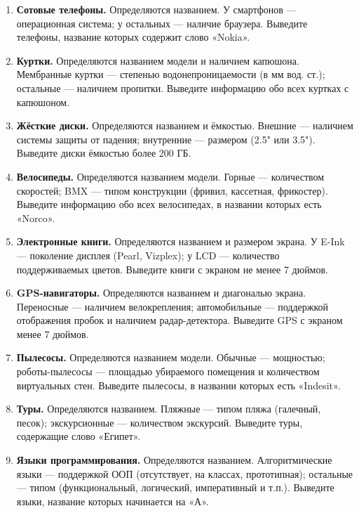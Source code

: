 \begin{enumerate}
    \item \textbf{Сотовые телефоны.}  
    Определяются названием. У смартфонов — операционная система; у остальных — наличие браузера.  
    Выведите телефоны, название которых содержит слово «Nokia».

    \item \textbf{Куртки.}  
    Определяются названием модели и наличием капюшона. Мембранные куртки — степенью водонепроницаемости (в мм вод. ст.); остальные — наличием пропитки.  
    Выведите информацию обо всех куртках с капюшоном.

    \item \textbf{Жёсткие диски.}  
    Определяются названием и ёмкостью. Внешние — наличием системы защиты от падения; внутренние — размером (2.5" или 3.5").  
    Выведите диски ёмкостью более 200 ГБ.

    \item \textbf{Велосипеды.}  
    Определяются названием модели. Горные — количеством скоростей; BMX — типом конструкции (фривил, кассетная, фрикостер).  
    Выведите информацию обо всех велосипедах, в названии которых есть «Norco».

    \item \textbf{Электронные книги.}  
    Определяются названием и размером экрана. У E-Ink — поколение дисплея (Pearl, Vizplex); у LCD — количество поддерживаемых цветов.  
    Выведите книги с экраном не менее 7 дюймов.

    \item \textbf{GPS-навигаторы.}  
    Определяются названием и диагональю экрана. Переносные — наличием велокрепления; автомобильные — поддержкой отображения пробок и наличием радар-детектора.  
    Выведите GPS с экраном менее 7 дюймов.

    \item \textbf{Пылесосы.}  
    Определяются названием модели. Обычные — мощностью; роботы-пылесосы — площадью убираемого помещения и количеством виртуальных стен.  
    Выведите пылесосы, в названии которых есть «Indesit».

    \item \textbf{Туры.}  
    Определяются названием. Пляжные — типом пляжа (галечный, песок); экскурсионные — количеством экскурсий.  
    Выведите туры, содержащие слово «Египет».

    \item \textbf{Языки программирования.}  
    Определяются названием. Алгоритмические языки — поддержкой ООП (отсутствует, на классах, прототипная); остальные — типом (функциональный, логический, императивный и т.п.).  
    Выведите языки, название которых начинается на «А».


\end{enumerate}
